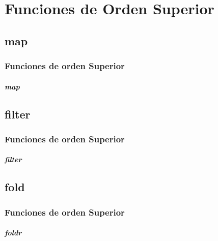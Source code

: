 \section{Funciones de Orden Superior}
\subsection{map}
\begin{frame}
  \frametitle{Funciones de orden Superior}
  \framesubtitle{\textit{map}}
\end{frame}
\subsection{filter}
\begin{frame}
  \frametitle{Funciones de orden Superior}
  \framesubtitle{\textit{filter}}
\end{frame}
\subsection{fold}
\begin{frame}
  \frametitle{Funciones de orden Superior}
  \framesubtitle{\textit{foldr}}
\end{frame}